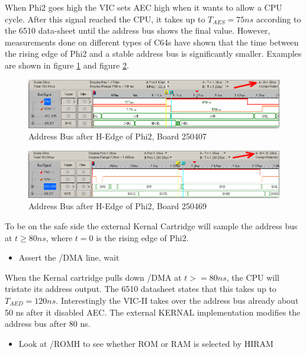 \documentclass[a4paper]{memoir}
\begin{document}
When Phi2 goes high the VIC sets AEC high when it wants to allow a
CPU cycle. After this signal reached the CPU, it takes up to $T_{AES} =
75 ns$ according to the 6510 data-sheet until the address bus shows
the final value. However, measurements done on different types of
C64s have shown that the time between the rising edge of Phi2 and a
stable address bus is significantly smaller. Examples are shown in
figure \ref {fig:addr250407} and figure \ref {fig:addr250469}.

\begin{figure}
    \centering
    \includegraphics[width=1.1\textwidth]{src/phi2-data-bus-250407}
    \caption{Address Bus after H-Edge of Phi2, Board 250407}
    \label{fig:addr250407}
\end{figure}

\begin{figure}
    \centering
    \includegraphics[width=1.1\textwidth]{src/phi2-data-bus-250469}
    \caption{Address Bus after H-Edge of Phi2, Board 250469}
    \label{fig:addr250469}
\end{figure}

To be on the safe side the external Kernal Cartridge will sample the
address bus at $t \ge 80 ns$, where $t = 0$ is the rising edge of Phi2.

\begin{itemize}
\item Assert the /DMA line, wait
\end{itemize}

When the Kernal cartridge pulls down /DMA at $t >= 80 ns$, the CPU
will tristate its address output. The 6510 datasheet states that
this takes up to $T_{AED} = 120 ns$. Interestingly the VIC-II takes over
the address bus already about 50 ns after it disabled AEC. The external
KERNAL implementation modifies the address bus after 80 ns.

\begin{itemize}
\item Look at /ROMH to see whether ROM or RAM is selected by HIRAM
\end{itemize}
\end{document}
